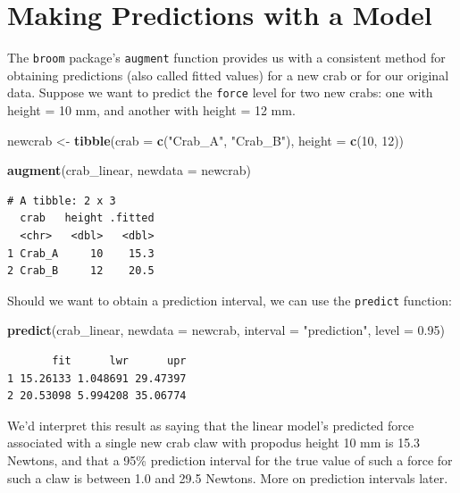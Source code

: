 \documentclass[
]{book}
\newenvironment{Shaded}{\begin{snugshade}}{\end{snugshade}}
\newcommand{\DataTypeTok}[1]{\textcolor[rgb]{0.13,0.29,0.53}{#1}}
\newcommand{\DecValTok}[1]{\textcolor[rgb]{0.00,0.00,0.81}{#1}}
\newcommand{\FloatTok}[1]{\textcolor[rgb]{0.00,0.00,0.81}{#1}}
\newcommand{\KeywordTok}[1]{\textcolor[rgb]{0.13,0.29,0.53}{\textbf{#1}}}
\newcommand{\NormalTok}[1]{#1}
\newcommand{\StringTok}[1]{\textcolor[rgb]{0.31,0.60,0.02}{#1}}
\begin{document}
\hypertarget{making-predictions-with-a-model}{%
\section{Making Predictions with a Model}\label{making-predictions-with-a-model}}

The \texttt{broom} package's \texttt{augment} function provides us with a consistent method for obtaining predictions (also called fitted values) for a new crab or for our original data. Suppose we want to predict the \texttt{force} level for two new crabs: one with height = 10 mm, and another with height = 12 mm.

\begin{Shaded}
\begin{Highlighting}[]
\NormalTok{newcrab <-}\StringTok{ }\KeywordTok{tibble}\NormalTok{(}\DataTypeTok{crab =} \KeywordTok{c}\NormalTok{(}\StringTok{"Crab_A"}\NormalTok{, }\StringTok{"Crab_B"}\NormalTok{), }\DataTypeTok{height =} \KeywordTok{c}\NormalTok{(}\DecValTok{10}\NormalTok{, }\DecValTok{12}\NormalTok{))}

\KeywordTok{augment}\NormalTok{(crab_linear, }\DataTypeTok{newdata =}\NormalTok{ newcrab)}
\end{Highlighting}
\end{Shaded}

\begin{verbatim}
# A tibble: 2 x 3
  crab   height .fitted
  <chr>   <dbl>   <dbl>
1 Crab_A     10    15.3
2 Crab_B     12    20.5
\end{verbatim}

Should we want to obtain a prediction interval, we can use the \texttt{predict} function:

\begin{Shaded}
\begin{Highlighting}[]
\KeywordTok{predict}\NormalTok{(crab_linear, }\DataTypeTok{newdata =}\NormalTok{ newcrab, }\DataTypeTok{interval =} \StringTok{"prediction"}\NormalTok{, }\DataTypeTok{level =} \FloatTok{0.95}\NormalTok{)}
\end{Highlighting}
\end{Shaded}

\begin{verbatim}
       fit      lwr      upr
1 15.26133 1.048691 29.47397
2 20.53098 5.994208 35.06774
\end{verbatim}

We'd interpret this result as saying that the linear model's predicted force associated with a single new crab claw with propodus height 10 mm is 15.3 Newtons, and that a 95\% prediction interval for the true value of such a force for such a claw is between 1.0 and 29.5 Newtons. More on prediction intervals later.
\end{document}
